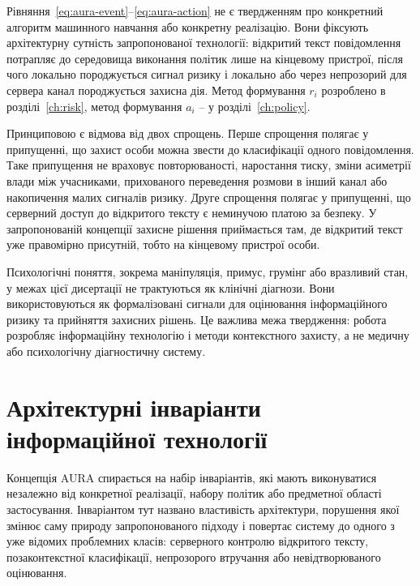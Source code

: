 Рівняння~\eqref{eq:aura-event}--\eqref{eq:aura-action} не є твердженням про конкретний алгоритм машинного навчання або конкретну реалізацію. Вони фіксують архітектурну сутність запропонованої технології: відкритий текст повідомлення потрапляє до середовища виконання політик лише на кінцевому пристрої, після чого локально породжується сигнал ризику і локально або через непрозорий для сервера канал породжується захисна дія. Метод формування \(r_i\) розроблено в розділі~\ref{ch:risk}, метод формування \(a_i\) -- у розділі~\ref{ch:policy}.

Принциповою є відмова від двох спрощень. Перше спрощення полягає у припущенні, що захист особи можна звести до класифікації одного повідомлення. Таке припущення не враховує повторюваності, наростання тиску, зміни асиметрії влади між учасниками, прихованого переведення розмови в інший канал або накопичення малих сигналів ризику. Друге спрощення полягає у припущенні, що серверний доступ до відкритого тексту є неминучою платою за безпеку. У запропонованій концепції захисне рішення приймається там, де відкритий текст уже правомірно присутній, тобто на кінцевому пристрої особи.

Психологічні поняття, зокрема маніпуляція, примус, грумінг або вразливий стан, у межах цієї дисертації не трактуються як клінічні діагнози. Вони використовуються як формалізовані сигнали для оцінювання інформаційного ризику та прийняття захисних рішень. Це важлива межа твердження: робота розробляє інформаційну технологію і методи контекстного захисту, а не медичну або психологічну діагностичну систему.

\section{Архітектурні інваріанти інформаційної технології}
\label{sec:architecture-invariants}

Концепція AURA спирається на набір інваріантів, які мають виконуватися незалежно від конкретної реалізації, набору політик або предметної області застосування. Інваріантом тут названо властивість архітектури, порушення якої змінює саму природу запропонованого підходу і повертає систему до одного з уже відомих проблемних класів: серверного контролю відкритого тексту, позаконтекстної класифікації, непрозорого втручання або невідтворюваного оцінювання.

